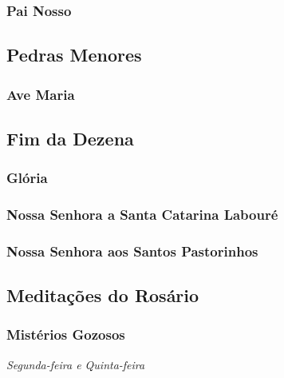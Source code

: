 \subsubsection{Pai Nosso}


\subsection{Pedras Menores}
\subsubsection{Ave Maria}


\subsection{Fim da Dezena}
\subsubsection{Glória}


\subsubsection{Nossa Senhora a Santa Catarina Labouré}\label{concebidasempecado}
\begin{paracol}{2}\switchcolumn{}\switchcolumn*{}\switchcolumn{}\end{paracol}

\subsubsection{Nossa Senhora aos Santos Pastorinhos}


\subsection{Meditações do Rosário}

\subsubsection{Mistérios Gozosos}
\begin{nscenter}\emph{Segunda-feira e Quinta-feira}\end{nscenter}

